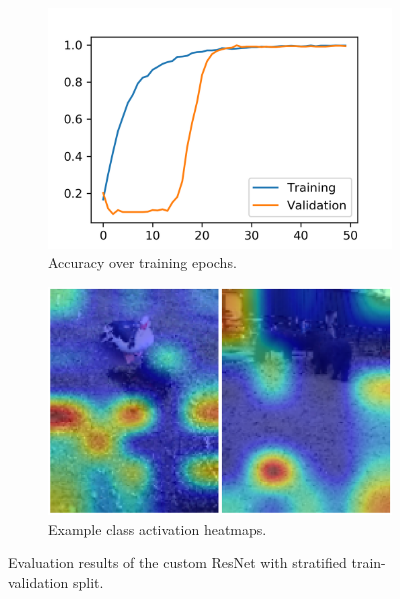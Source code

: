 \documentclass{l4proj}
\begin{document}
\begin{figure}[ht]
  \centering
  \begin{subfigure}[h!]{0.42\textwidth}
    \includegraphics[width=\textwidth, trim={0cm 0cm 0cm 0.7cm}, clip=true]{images/evaluation/stratified/accuracy.png}
    \caption{Accuracy over training epochs.}
    \label{fig:acc_stratified}
  \end{subfigure}
  \begin{subfigure}[h!]{0.4\textwidth}
    \includegraphics[width=\textwidth]{images/evaluation/stratified/heatmaps.png}
    \caption{Example class activation heatmaps.}
    \label{fig:heatmap_stratified}
  \end{subfigure}
  \caption{Evaluation results of the custom ResNet with stratified train-validation split.}
\end{figure}
\end{document}
